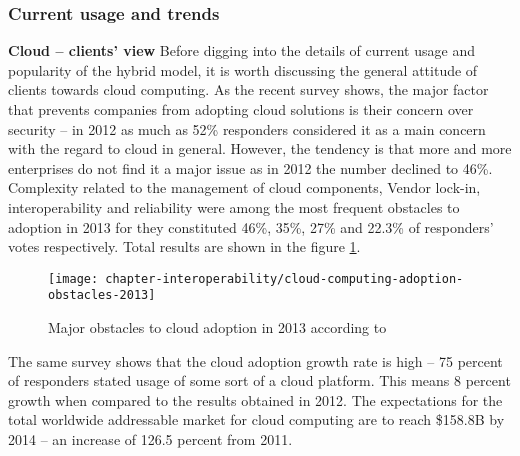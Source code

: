 \subsubsection{Current usage and trends}
\begin{asparaenum}
 \item[\textbf{Cloud -- clients' view}] Before digging into the details of current usage and popularity of the hybrid model, it is worth discussing the general attitude of clients towards cloud computing. As the recent survey \cite{NBSurvey13} shows, the major factor that prevents companies from adopting cloud solutions is their concern over security -- in 2012 as much as 52\% responders considered it as a main concern with the regard to cloud in general. However, the tendency is that more and more enterprises do not find it a major issue as in 2012 the number declined to 46\%.
Complexity related to the management of cloud components, Vendor lock-in, interoperability and reliability were among the most frequent obstacles to adoption in 2013 for they constituted 46\%, 35\%, 27\% and 22.3\% of responders' votes respectively. Total results are shown in the figure \ref{fig:cloud-computing-adoption-obstacles-2013}.
\begin{figure}[!ht]
  \begin{center}
    \texttt{[image: chapter-interoperability/cloud-computing-adoption-obstacles-2013]}
  \end{center}
  \caption{Major obstacles to cloud adoption in 2013 according to \cite{NBSurvey13}}
  \label{fig:cloud-computing-adoption-obstacles-2013}
\end{figure}
The same survey shows that the cloud adoption growth rate is high -- 75 percent of responders stated usage of some sort of a cloud platform. This means 8 percent growth when compared to the results obtained in 2012. The expectations for the total worldwide addressable market for cloud computing are to reach \$158.8B by 2014 -- an increase of 126.5 percent from 2011.
 

\end{asparaenum}
